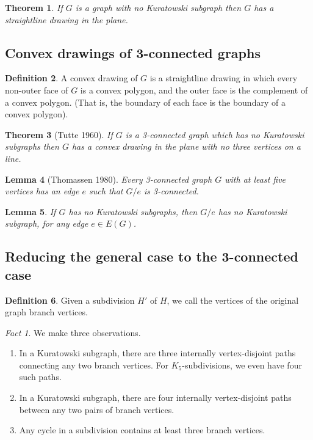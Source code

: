 \documentclass[10pt, fleqn, a4paper, landscape]{article}
\theoremstyle{plain} %
\newtheorem{thm}{Theorem}
\newtheorem{lem}[thm]{Lemma}
\theoremstyle{remark} %
\newtheorem{fact}{Fact}
\theoremstyle{definition} %
\newtheorem{defi}[thm]{Definition}
\begin{document}
\begin{multicols}{3}
\begin{tiny}
\begin{thm}
If $G$ is a graph with no Kuratowski subgraph then $G$ has a straightline drawing in the plane.
\end{thm}

\subsection{Convex drawings of 3-connected graphs}

\begin{defi}
A convex drawing of $G$ is a straightline drawing in which every non-outer face of $G$ is a convex polygon, and the outer face is the complement of a convex polygon. (That is, the boundary of each face is the boundary of a convex polygon).
\end{defi}

\begin{thm}[Tutte 1960]
If $G$ is a 3-connected graph which has no Kuratowski subgraphs then
$G$ has a convex drawing in the plane with no three vertices on a line.
\end{thm}

\begin{lem}[Thomassen 1980]
Every 3-connected graph $G$ with at least five vertices has an edge
$e$ such that $G\slash e$ is 3-connected.
\end{lem}

\begin{lem}
If $G$ has no Kuratowski subgraphs, then $G\slash e$ has no Kuratowski subgraph, for any edge $e\in E(G)$.
\end{lem}

\subsection{Reducing the general case to the 3-connected case}

\begin{defi}
Given a subdivision $H'$ of $H$, we call the vertices of the original graph branch vertices.
\end{defi}
\addtocounter{thm}{1}
\begin{fact}
We make three observations. 
\begin{enumerate}
\item  In a Kuratowski subgraph, there are three internally vertex-disjoint paths connecting any two
branch vertices. For $K_5$-subdivisions, we even have four such paths.
\item In a Kuratowski subgraph, there are four internally vertex-disjoint paths between any two pairs
of branch vertices.
\item Any cycle in a subdivision contains at least three branch vertices.
\end{enumerate}
\end{fact}


\end{tiny}
\end{multicols}
\end{document}
